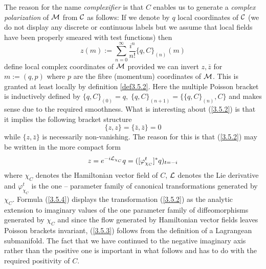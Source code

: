 \documentclass[12pt]{report}
\def\be{\begin{equation}}
\def\ee{\end{equation}}
\begin{document}
The reason for the name {\it complexifier} is that $C$ enables us to
generate a {\it complex polarization} of $\cal M$ from $\cal C$ as 
follows: If we denote by $q$ local coordinates of $\cal C$ (we do not 
display any discrete or continuous labels but we assume that local fields
have been properly smeared with test functions) then 
\be \label{3.5.2}
z(m):=\sum_{n=0}^\infty \frac{i^n}{n !} \{q,C\}_{(n)}(m)
\ee
define local complex coordinates of $\cal M$ provided we can invert 
$z,\bar{z}$ for $m:=(q,p)$ where $p$ are the fibre (momentum) 
coordinates of $\cal M$. This is granted at least locally by 
definition \ref{def3.5.2}. Here the multiple Poisson bracket
is inductively defined by $\{q,C\}_{(0)}=q,\;
\{q,C\}_{(n+1)}=\{\{q,C\}_{(n)},C\}$ and makes sense due to the required 
smoothness. What is interesting about 
(\ref{3.5.2}) is that it implies the following bracket structure
\be \label{3.5.3}
\{z,z\}=\{\bar{z},\bar{z}\}=0
\ee
while $\{z,\bar{z}\}$ is necessarily non-vanishing. The reason for this
is that (\ref{3.5.2}) may be written in the more compact form
\be \label{3.5.4}
z=e^{-i{\cal L}_{\chi_C}} q=([\varphi_{\chi_C}^t]^\ast q)_{t=-i}
\ee
where $\chi_C$ denotes the Hamiltonian vector field of $C$,
$\cal L$ denotes the Lie 
derivative and $\varphi^t_{\chi_C}$ is the one -- parameter family of 
canonical transformations generated by $\chi_C$. 
Formula (\ref{3.5.4}) displays the transformation (\ref{3.5.2})
as the analytic extension to imaginary values of the one parameter family
of diffeomorphisms generated by $\chi_C$ and since the flow generated by 
Hamiltonian vector fields leaves Poisson brackets invariant, (\ref{3.5.3})
follows from the definition of a Lagrangean submanifold. The fact that
we have continued to the negative imaginary axis rather than the 
positive one is important in what follows and has to do with the required
positivity of $C$.
\end{document}
